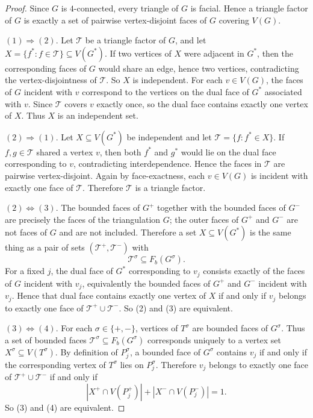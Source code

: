 \documentclass[10pt,a4paper]{amsart}
\begin{document}
\begin{proof}
Since $G$ is $4$-connected, every triangle of $G$ is facial. Hence a
triangle factor of $G$ is exactly a set of pairwise vertex-disjoint faces of
$G$ covering $V(G)$.

$(1)\Rightarrow(2)$.
Let $\mathcal T$ be a triangle factor of $G$, and let
$X=\{f^*:f\in\mathcal T\}\subseteq V(G^*)$.
If two vertices of $X$ were adjacent in $G^*$, then the corresponding faces
of $G$ would share an edge, hence two vertices, contradicting the
vertex-disjointness of $\mathcal T$. So $X$ is independent.
For each $v\in V(G)$, the faces of $G$ incident with $v$ correspond to
the vertices on the dual face of $G^*$ associated with $v$. Since
$\mathcal T$ covers $v$ exactly once, so the dual face contains exactly one
vertex of $X$. Thus $X$ is an independent set.

$(2)\Rightarrow(1)$.
Let $X\subseteq V(G^*)$ be independent and let $\mathcal T=\{f:f^*\in X\}$.
If $f,g\in\mathcal T$ shared a vertex $v$, then both $f^*$ and $g^*$
would lie on the dual face corresponding to $v$, contradicting interdependence. 
Hence the faces in $\mathcal T$ are pairwise vertex-disjoint.
Again by face-exactness, each $v\in V(G)$ is incident with exactly one face
of $\mathcal T$. Therefore $\mathcal T$ is a triangle factor.

$(2)\Leftrightarrow(3)$.
The bounded faces of $G^+$ together with the bounded faces of $G^-$ are
precisely the faces of the triangulation $G$; the outer faces of $G^+$ and
$G^-$ are not faces of $G$ and are not included. Therefore a set
$X\subseteq V(G^*)$ is the same thing as a pair of sets
$(\mathcal T^+,\mathcal T^-)$ with
\[
\mathcal T^\sigma\subseteq F_b(G^\sigma).
\]
For a fixed $j$, the dual face of $G^*$ corresponding to $v_j$ consists
exactly of the faces of $G$ incident with $v_j$, equivalently the bounded
faces of $G^+$ and $G^-$ incident with $v_j$.
Hence that dual face contains exactly one vertex of $X$ if and only if
$v_j$ belongs to exactly one face of $\mathcal T^+\cup\mathcal T^-$.
So (2) and (3) are equivalent.

$(3)\Leftrightarrow(4)$.
For each $\sigma\in\{+,-\}$, vertices of $T^\sigma$ are bounded faces of
$G^\sigma$. Thus a set of bounded faces
$\mathcal T^\sigma\subseteq F_b(G^\sigma)$ corresponds uniquely to a vertex
set $X^\sigma\subseteq V(T^\sigma)$.
By definition of $P_j^\sigma$, a bounded face of $G^\sigma$ contains $v_j$
if and only if the corresponding vertex of $T^\sigma$ lies on $P_j^\sigma$.
Therefore $v_j$ belongs to exactly one face of
$\mathcal T^+\cup\mathcal T^-$ if and only if
\[
|X^+\cap V(P_j^+)|+|X^-\cap V(P_j^-)|=1.
\]
So (3) and (4) are equivalent.
\end{proof}
\end{document}
